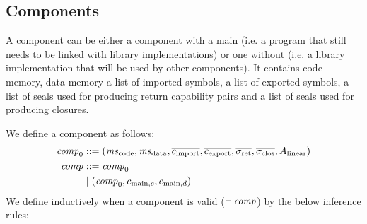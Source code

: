 \documentclass[a4paper]{article}
\begin{document}
\subsection{Components}
\label{sec:components}

A component can be either a component with a main (i.e. a program that still needs to be linked with library implementations) or one without (i.e. a library implementation that will be used by other components). 
It contains code memory, data memory a list of imported symbols, a list of exported symbols, a list of seals used for producing return capability pairs and a list of seals used for producing closures.

We define a component as follows:
\begin{align*}
  \var{comp}_0 &\mathrel{::=} (\mscode,\msdata,\overline{c_{\mathrm{import}}},\overline{c_{\mathrm{export}}},\sigrets,\sigcloss,A_\linear)\\
  \var{comp} &\mathrel{::=} \var{comp}_0\\
               &\mid  (\var{comp}_0,c_{\mathrm{main},c}, c_{\mathrm{main},d})
\end{align*}
\clearpage
We define inductively when a component is valid ($\vdash \mathit{comp}$) by the below inference rules:
\end{document}
